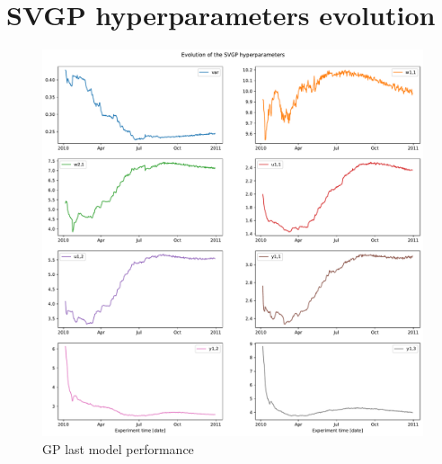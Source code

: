 \section{SVGP hyperparameters evolution}\label{anx:hyperparams_evol}

\begin{figure}[ht]
    \centering
    \includegraphics[width =
    \textwidth]{Plots/1_SVGP_480pts_inf_window_12_averageYear_evol_hyperparameters.pdf}
    \caption{GP last model performance}
    \label{fig:SVGP_evol_hyperparameters}
\end{figure}

